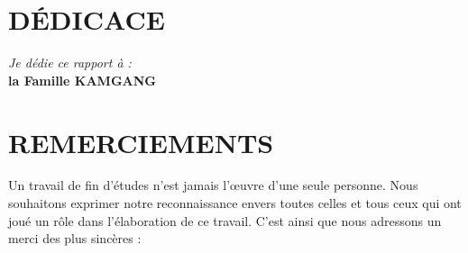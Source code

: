 
\chapter*{DÉDICACE}

\vspace*{\fill}
\begin{center}
\begin{tcolorbox}[enhanced, nobeforeafter,
    colback=keycesoft, colframe=keyceaccent,
    boxrule=1.2pt, arc=10pt,
    width=0.78\textwidth,
    left=16pt, right=16pt, top=22pt, bottom=22pt,
    borderline={0.4pt}{5pt}{keyceaccent!55}]
  \centering
  {\large\itshape\color{keycegrey} Je dédie ce rapport à :}\\[20pt]
  {\fontsize{20}{24}\selectfont\bfseries\color{keyceblue} la Famille KAMGANG}
\end{tcolorbox}
\end{center}
\vspace*{\fill}

\cleardoublepage
{}
\chapter*{REMERCIEMENTS}

Un travail de fin d'études n'est jamais l'œuvre d'une seule personne. Nous
souhaitons exprimer notre reconnaissance envers toutes celles et tous ceux qui
ont joué un rôle dans l'élaboration de ce travail. C'est ainsi que nous
adressons un merci des plus sincères :

